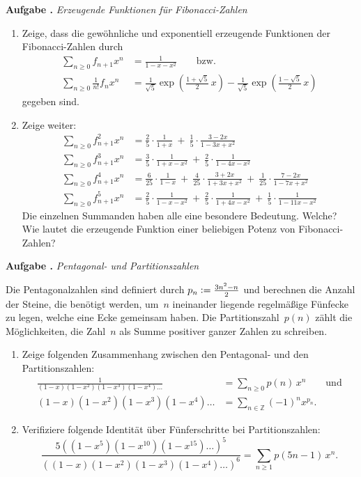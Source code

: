 \documentclass[a4paper,ngerman,twoside]{scrartcl}
\newcommand{\defeq}{\vcentcolon=}
\newlength{\aufgabenskip}
\newcounter{aufgabennummer}
\newenvironment{aufgabe}[1]{
  \addtocounter{aufgabennummer}{1}
  \textbf{Aufgabe \theaufgabennummer.} \emph{#1} \par
}{\vspace{\aufgabenskip}}
\begin{document}
\begin{aufgabe}{Erzeugende Funktionen für Fibonacci-Zahlen}
\begin{enumerate}
\item Zeige, dass die gewöhnliche und exponentiell erzeugende Funktionen der
Fibonacci-Zahlen durch
\begin{align*}
  \sum_{n\geq 0} f_{n+1}x^n &= \frac{1}{1-x-x^2} \qquad\text{bzw.} \\
  \sum_{n\geq 0} \tfrac{1}{n!}f_n x^n &= \tfrac{1}{\sqrt{5}}\exp\left(\tfrac{1+\sqrt{5}}{2}\, x\right) - \tfrac{1}{\sqrt{5}}\exp\left(\tfrac{1-\sqrt{5}}{2}\, x\right)
\end{align*}
gegeben sind.
\item Zeige weiter:
\begin{align*}
\sum_{n\geq 0} f_{n+1}^2x^n &= \frac{2}{5}\cdot\frac{1}{1+x}\ +\ \frac{1}{5}\cdot\frac{3-2x}{1-3x+x^2} \\[0.2em]
\sum_{n\geq 0} f_{n+1}^3x^n &= \frac{3}{5}\cdot\frac{1}{1+x-x^2}\ +\ \frac{2}{5}\cdot\frac{1}{1-4x-x^2} \\[0.2em]
\sum_{n\geq 0} f_{n+1}^4x^n &= \frac{6}{25}\cdot\frac{1}{1-x}\ +\ \frac{4}{25}\cdot\frac{3+2x}{1+3x+x^2}\ +\ \frac{1}{25}\cdot\frac{7-2x}{1-7x+x^2}\\[0.2em]
\sum_{n\geq 0} f_{n+1}^5x^n &= \frac{2}{5}\cdot\frac{1}{1-x-x^2}\ +\ \frac{2}{5}\cdot\frac{1}{1+4x-x^2}\ +\ \frac{1}{5}\cdot\frac{1}{1-11x-x^2}
\end{align*}
Die einzelnen Summanden haben alle eine besondere Bedeutung. Welche? Wie lautet
die erzeugende Funktion einer beliebigen Potenz von Fibonacci-Zahlen?
\end{enumerate}
\end{aufgabe}

\begin{aufgabe}{Pentagonal- und Partitionszahlen}
Die Pentagonalzahlen sind definiert durch $p_n \defeq \tfrac{3n^2-n}{2}$ und
berechnen die Anzahl der Steine, die benötigt werden, um~$n$ ineinander
liegende regelmäßige Fünfecke zu legen, welche eine Ecke gemeinsam haben. Die
Partitionszahl~$p(n)$ zählt die Möglichkeiten,
die Zahl~$n$ als Summe positiver ganzer Zahlen zu schreiben.
\begin{enumerate}
\item Zeige folgenden Zusammenhang zwischen den Pentagonal- und den
Partitionszahlen:
\begin{align*}
\frac{1}{(1-x)(1-x^2)(1-x^3)(1-x^4)\ldots} &= \sum_{n\geq 0} p(n) \,x^n \qquad\text{und} \\[0.4em]
(1-x)(1-x^2)(1-x^3)(1-x^4)\ldots &= \sum_{n \in \mathbb{Z}} (-1)^n x^{p_n}.
\end{align*}
\item Verifiziere folgende Identität über Fünferschritte bei Partitionszahlen:
\[
\frac{5\left((1-x^5)(1-x^{10})(1-x^{15})\ldots \right)^5 }{\left((1-x)(1-x^2)(1-x^3)(1-x^4)\ldots\right)^6} 
= \sum_{n\geq 1} p(5n-1)\,x^n. \]
\end{enumerate}
\end{aufgabe}
\end{document}
